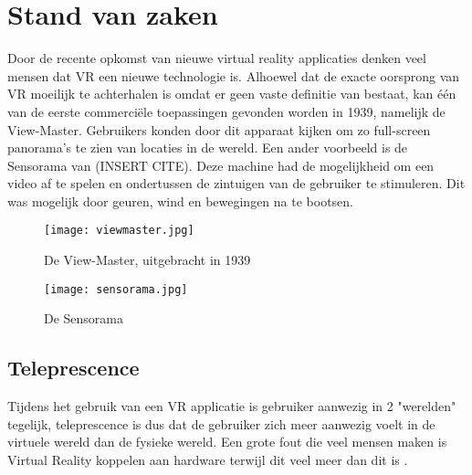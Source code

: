 \chapter{Stand van zaken}
\label{ch:stand-van-zaken}



Door de recente opkomst van nieuwe virtual reality applicaties denken veel mensen dat VR een nieuwe technologie is. Alhoewel dat de exacte oorsprong van VR moeilijk te achterhalen is omdat er geen vaste definitie van bestaat, kan één van de eerste commerciële toepassingen gevonden worden in 1939, namelijk de View-Master. Gebruikers konden door dit apparaat kijken om zo full-screen panorama's te zien van locaties in de wereld. Een ander voorbeeld is de Sensorama van (INSERT CITE). Deze machine had de mogelijkheid om een video af te spelen en ondertussen de zintuigen van de gebruiker te stimuleren. Dit was mogelijk door geuren, wind en bewegingen na te bootsen.
\begin{figure}
    \texttt{[image: viewmaster.jpg]}
    \caption{De View-Master, uitgebracht in 1939}
    \label{fig:viewmaster}
\end{figure}

\begin{figure}
    \texttt{[image: sensorama.jpg]}
    \caption{De Sensorama}
    \label{fig:sensorama}
\end{figure}

\section{Teleprescence}
Tijdens het gebruik van een VR applicatie is gebruiker aanwezig in 2 "werelden" tegelijk, teleprescence is dus dat de gebruiker zich meer aanwezig voelt in de virtuele wereld dan de fysieke wereld.
Een grote fout die veel mensen maken is Virtual Reality koppelen aan hardware terwijl dit veel meer dan dit is \autocite{Steuer1992}.


